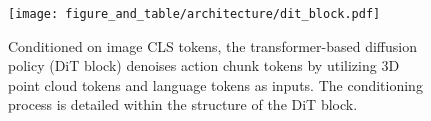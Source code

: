 \begin{figure}[t]
    \centering
    \texttt{[image: figure\_and\_table/architecture/dit\_block.pdf]}
    \caption{Conditioned on image CLS tokens, the transformer-based diffusion policy (DiT block) denoises action chunk tokens by utilizing 3D point cloud tokens and language tokens as inputs. The conditioning process is detailed within the structure of the DiT block.}
    \label{fig:dit_block}
\end{figure}